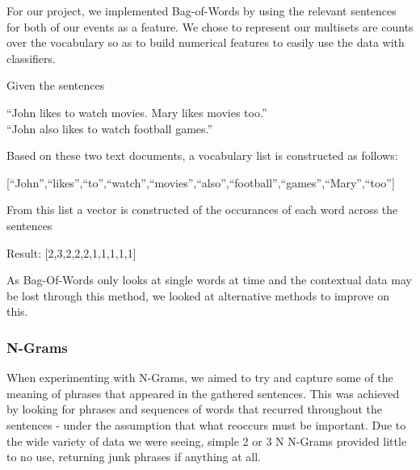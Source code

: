 \documentclass[bsc,frontabs,twoside,singlespacing,parskip,deptreport]{infthesis}     %
\begin{document}
For our project, we implemented Bag-of-Words by using the relevant sentences for both of our events as a feature.
We chose to represent our multisets are counts over the vocabulary so as to build numerical features to easily
use the data with classifiers.
\begin{tcolorbox}[width=\textwidth,
                  interior hidden,
                  boxsep=10pt,
                  left=0pt,
                  right=0pt,
                  top=2pt,
                  ]%
  Given the sentences \vspace{0.5em}\\
  \begin{center}``John likes to watch movies. Mary likes movies too.''\\
  ``John also likes to watch football games.''\vspace{1em}\\
   \end{center}
    Based on these two text documents, a vocabulary list is constructed as follows:\vspace{1em}\\
    \begin{center}
  [``John'',``likes'',``to'',``watch'',``movies'',``also'',``football'',``games'',``Mary'',``too'']\vspace{1em}\\
\end{center}
    From this list a vector is constructed of the occurances
    of each word across the sentences\vspace{1em}\\
 \begin{center} 
  Result: [2,3,2,2,2,1,1,1,1,1]
\end{center}
\end{tcolorbox}

As Bag-Of-Words only looks at single words at time and the contextual data may be lost through this method, we looked at
alternative methods to improve on this.

\subsubsection{N-Grams}
When experimenting with N-Grams, we aimed to try and capture some of the meaning of phrases that appeared in the gathered
sentences.
This was achieved by looking for phrases and sequences of words that recurred throughout the sentences - under the assumption
that what reoccurs must be important. Due to the wide variety of data we were seeing, simple 2 or 3 N N-Grams provided
little to no use, returning junk phrases if anything at all.
\end{document}
